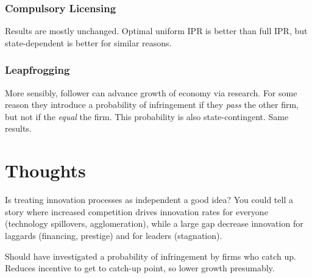 \documentclass[11pt]{article}
\begin{document}
  \subsubsection{Compulsory Licensing}
  \label{subsub:compulsory_licensing}

    Results are mostly unchanged.  Optimal uniform IPR is better than full IPR, but state-dependent is better for similar reasons.

  \subsubsection{Leapfrogging}
  \label{subsub:leapfrogging}

    More sensibly, follower can advance growth of economy via research.  For some reason they introduce a probability of infringement if they \emph{pass} the other firm, but not if the \emph{equal} the firm.  This probability is also state-contingent.  Same results.

\section{Thoughts}
\label{sec:thought}

  Is treating innovation processes as independent a good idea?  You could tell a story where increased competition drives innovation rates for everyone (technology spillovers, agglomeration), while a large gap decrease innovation for laggards (financing, prestige) and for leaders (stagnation).

  Should have investigated a probability of infringement by firms who catch up.  Reduces incentive to get to catch-up point, so lower growth presumably.
\end{document}
